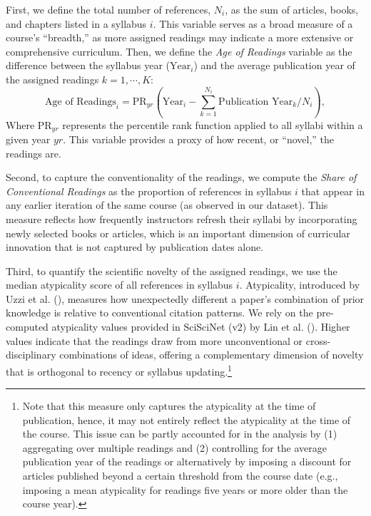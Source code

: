 \documentclass[
  british,
  11pt,
]{article}
\begin{document}
First, we define the total number of references, \(N_i\), as the sum of articles, books, and chapters listed in a syllabus \(i\). This variable serves as a broad measure of a course's ``breadth,'' as more assigned readings may indicate a more extensive or comprehensive curriculum. Then, we define the \emph{Age of Readings} variable as the difference between the syllabus year (\(\text{Year}_i\)) and the average publication year of the assigned readings \(k=1,\cdots,K\):\\
\[
  \text{Age of Readings}_i = \text{PR}_{yr}\left(\text{Year}_i - \sum_{k=1}^{N_i} \text{Publication Year}_k / N_i\right),
\]
Where \(\text{PR}_{yr}\) represents the percentile rank function applied to all syllabi within a given year \(yr\). This variable provides a proxy of how recent, or ``novel,'' the readings are.

Second, to capture the conventionality of the readings, we compute the \emph{Share of Conventional Readings} as the proportion of references in syllabus \(i\) that appear in any earlier iteration of the same course (as observed in our dataset). This measure reflects how frequently instructors refresh their syllabi by incorporating newly selected books or articles, which is an important dimension of curricular innovation that is not captured by publication dates alone.

Third, to quantify the scientific novelty of the assigned readings, we use the median atypicality score of all references in syllabus \(i\). Atypicality, introduced by Uzzi et al. (), measures how unexpectedly different a paper's combination of prior knowledge is relative to conventional citation patterns. We rely on the pre-computed atypicality values provided in SciSciNet (v2) by Lin et al. (). Higher values indicate that the readings draw from more unconventional or cross-disciplinary combinations of ideas, offering a complementary dimension of novelty that is orthogonal to recency or syllabus updating.\footnote{
  Note that this measure only captures the atypicality at the time of publication, hence, it may not entirely reflect the atypicality at the time of the course. This issue can be partly accounted for in the analysis by (1) aggregating over multiple readings and (2) controlling for the average publication year of the readings or alternatively by imposing a discount for articles published beyond a certain threshold from the course date (e.g., imposing a mean atypicality for readings five years or more older than the course year).}
\end{document}
